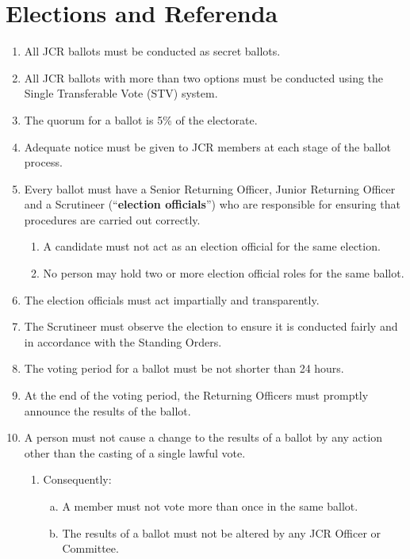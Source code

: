 \documentclass[12pt]{article}
\begin{document}
\section{Elections and Referenda}
\begin{enumerate}
    \item All JCR ballots must be conducted as secret ballots.
    \item All JCR ballots with more than two options must be conducted using the Single Transferable Vote (STV) system.
    \item The quorum for a ballot is 5\% of the electorate.
    \item Adequate notice must be given to JCR members at each stage of the ballot process.
    \item Every ballot must have a Senior Returning Officer, Junior Returning Officer and a Scrutineer (``\textbf{election officials}'') who are responsible for ensuring that procedures are carried out correctly.
    \begin{enumerate}
        \item A candidate must not act as an election official for the same election.
        \item No person may hold two or more election official roles for the same ballot.
    \end{enumerate}
    \item The election officials must act impartially and transparently.
    \item The Scrutineer must observe the election to ensure it is conducted fairly and in accordance with the Standing Orders.
    \item The voting period for a ballot must be not shorter than 24 hours.
    \item At the end of the voting period, the Returning Officers must promptly announce the results of the ballot.
    \item A person must not cause a change to the results of a ballot by any action other than the casting of a single lawful vote.
    \begin{enumerate}
        \item Consequently:
        \begin{enumerate}[(a)]
            \item A member must not vote more than once in the same ballot.
            \item The results of a ballot must not be altered by any JCR Officer or Committee.
        \end{enumerate}

\end{enumerate}
\end{enumerate}
\end{document}
